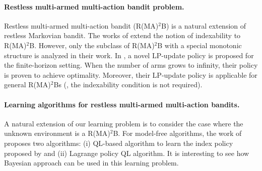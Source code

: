 \paragraph{Restless multi-armed multi-action bandit problem.}
Restless multi-armed multi-action bandit (R(MA)$^2$B) is a natural extension of restless Markovian bandit.
The works of \cite{glazebrook2011general,hodge2015asymptotic} extend the notion of indexability to R(MA)$^2$B.
However, only the subclass of R(MA)$^2$B with a special monotonic structure is analyzed in their work.
In \cite{gast2022lp}, a novel LP-update policy is proposed for the finite-horizon setting.
When the number of arms grows to infinity, their policy is proven to achieve optimality.
Moreover, their LP-update policy is applicable for general R(MA)$^2$Bs (\ie, the indexability condition is not required).



\paragraph{Learning algorithms for restless multi-armed multi-action bandits.}
A natural extension of our learning problem is to consider the case where the unknown environment is a R(MA)$^2$B.
For model-free algorithms, the work of \cite{killian2021q} proposes two algorithms: (i) QL-based algorithm to learn the index policy proposed by \cite{glazebrook2011general} and (ii) Lagrange policy QL algorithm.
It is interesting to see how Bayesian approach can be used in this learning problem.




\endgroup
